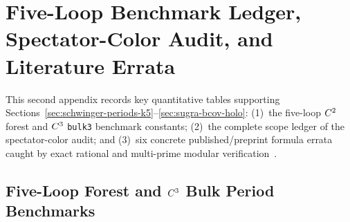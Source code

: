\section{Five-Loop Benchmark Ledger, Spectator-Color Audit, and Literature Errata}
\label{app:periods-errata}

This second appendix records key quantitative tables supporting Sections~\ref{sec:schwinger-periods-k5}--\ref{sec:sugra-bcov-holo}: (1)~the five-loop $C^2$ forest and $C^3$ \texttt{bulk3} benchmark constants; (2)~the complete scope ledger of the spectator-color audit; and (3)~six concrete published/preprint formula errata caught by exact rational and multi-prime modular verification~\cite{Repo9e833c8}.

\subsection{Five-Loop Forest and \texorpdfstring{$C^3$}{C\^3} Bulk Period Benchmarks}
\label{subsec:app-fiveloop-ledger}

